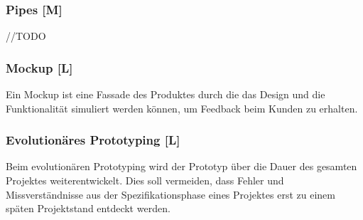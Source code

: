 \subsubsection{Pipes [M]}
//TODO

\subsubsection{Mockup [L]}
Ein Mockup ist eine Fassade des Produktes durch die das Design und die Funktionalität simuliert werden können, um Feedback beim Kunden zu erhalten. \cite{Mokup}


\subsubsection{Evolutionäres Prototyping [L]}
\label{ch::ongoing-prototyping}
Beim evolutionären Prototyping wird der Prototyp über die Dauer des gesamten Projektes weiterentwickelt. Dies soll vermeiden, dass Fehler und Missverständnisse aus der Spezifikationsphase eines Projektes erst zu einem späten Projektstand entdeckt werden. \cite{Prototyping}